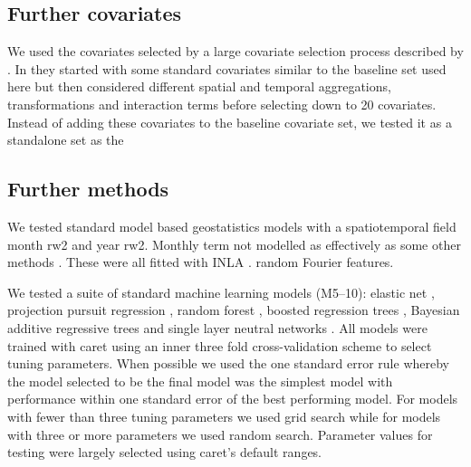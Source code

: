 \documentclass{bmcart}
\begin{document}
\subsection*{Further covariates}















We used the covariates selected by a large covariate selection process described by \cite{weiss2015re}.
In \cite{weiss2015re} they started with some standard covariates similar to the baseline set used here but then considered different spatial and temporal aggregations, transformations and interaction terms before selecting down to 20 covariates.
Instead of adding these covariates to the baseline covariate set, we tested it as a standalone set as the


\subsection*{Further methods}



We tested standard model based geostatistics models with a spatiotemporal field
 month rw2 and year rw2.
 Monthly term not modelled as effectively as some other methods \cite{nguyen2020mapping}.
These were all fitted with INLA \cite{INLA}.
random Fourier features.



We tested a suite of standard machine learning models (M5--10): elastic net \cite{}, projection pursuit regression \cite{}, random forest \cite{ranger},  boosted regression trees \cite{xgboost}, Bayesian additive regressive trees \cite{} and single layer neutral networks \cite{nnet}.
All models were trained with caret \cite{caret} using an inner three fold cross-validation scheme to select tuning parameters.
When possible we used the one standard error rule \cite{breiman1984classification} whereby the model selected to be the final model was the simplest model with performance within one standard error of the best performing model.
For models with fewer than three tuning parameters we used grid search while for models with three or more parameters we used random search.
Parameter values for testing were largely selected using caret's default ranges.
\end{document}

